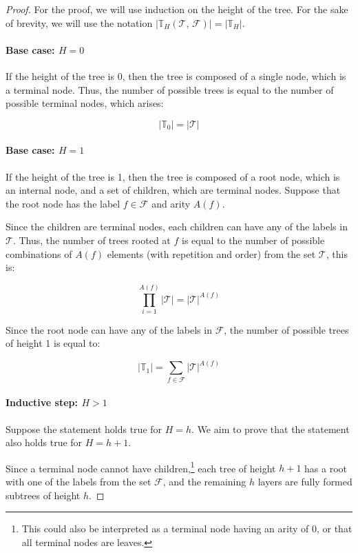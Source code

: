   \begin{proof}
    For the proof, we will use induction on the height of the tree.
    For the sake of brevity, we will use the notation
    \(|\mathbb{T}_{H}(\mathcal{T},\, \mathcal{F})| = |\mathbb{T}_{H}|\).

    \paragraph{Base case: \(H = 0\)}
    If the height of the tree is 0, then the tree is composed of a single node,
    which is a terminal node.
    Thus, the number of possible trees is equal to the number of possible
    terminal nodes, which arises:

    \[
      |\mathbb{T}_{0}| = |\mathcal{T}|
    \]

    \paragraph{Base case: \(H = 1\)}
    If the height of the tree is 1, then the tree is composed of a root node,
    which is an internal node, and a set of children, which are terminal nodes.
    Suppose that the root node has the label \(f \in \mathcal{F}\) and arity
    \(A(f)\).
    
    Since the children are terminal nodes, each children can have any of the
    labels in \(\mathcal{T}\).
    Thus, the number of trees rooted at \(f\) is equal to the number of possible
    combinations of \(A(f)\) elements (with repetition and order) from the set
    \(\mathcal{T}\), this is:

    \[
      \prod_{i=1}^{A(f)} |\mathcal{T}| = |\mathcal{T}|^{A(f)}
    \]

    Since the root node can have any of the labels in \(\mathcal{F}\), the
    number of possible trees of height 1 is equal to:

    \[
      |\mathbb{T}_{1}| = \sum_{f \in \mathcal{F}} |\mathcal{T}|^{A(f)}
    \]

    \paragraph{Inductive step: \(H > 1\)}
    Suppose the statement holds true for \(H = h\).
    We aim to prove that the statement also holds true for \(H = h + 1\).

    Since a terminal node cannot have children,\footnote{
      This could also be interpreted as a terminal node having an arity of 0, or
      that all terminal nodes are leaves.
    } each tree of height \(h + 1\) has a root with one of the labels from the
    set \(\mathcal{F}\), and the remaining \(h\) layers are fully formed
    subtrees of height \(h\).


\end{proof}
